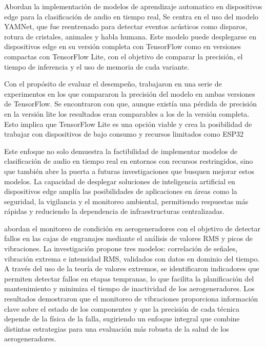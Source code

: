

\citeauthor{malmberg_real-time_2021} \citeyear{malmberg_real-time_2021} Abordan la implementación de modelos de aprendizaje automatico en dispositivos edge para la clasificación de audio en tiempo real, Se centra en el uso del modelo YAMNet, que fue reentrenado para detectar eventos acústicos como disparos, rotura de cristales, animales y habla humana. Este modelo puede desplegarse en dispositivos edge en su versión completa con TensorFlow como en versiones compactas con TensorFlow Lite, con el objetivo de comparar la precisión, el tiempo de inferencia y el uso de memoria de cada variante.

Con el propósito de evaluar el desempeño, trabajaron en una serie de experimentos en los que compararon la precisión del modelo en ambas versiones de TensorFlow. Se encontraron con que, aunque existía una pérdida de precisión en la versión lite los resultados eran comparables a los de la versión completa. Esto implica que TensorFlow Lite es una opción viable y crea la posibilidad de trabajar con dispositivos de bajo consumo y recursos limitados como ESP32

Este enfoque no solo demuestra la factibilidad de implementar modelos de clasificación de audio en tiempo real en entornos con recursos restringidos, sino que también abre la puerta a futuras investigaciones que busquen mejorar estos modelos. La capacidad de desplegar soluciones de inteligencia artificial en dispositivos edge amplía las posibilidades de aplicaciones en áreas como la seguridad, la vigilancia y el monitoreo ambiental, permitiendo respuestas más rápidas y reduciendo la dependencia de infraestructuras centralizadas.


\citeauthor{igba_analysing_2016} \citeyear{igba_analysing_2016} abordan el monitoreo de condición en aerogeneradores con el objetivo de detectar fallos en las cajas de engranajes mediante el análisis de valores RMS y picos de vibraciones. La investigación propone tres modelos: correlación de señales, vibración extrema e intensidad RMS, validados con datos en dominio del tiempo. A través del uso de la teoría de valores extremos, se identificaron indicadores que permiten detectar fallos en etapas tempranas, lo que facilita la planificación del mantenimiento y minimiza el tiempo de inactividad de los aerogeneradores. Los resultados demostraron que el monitoreo de vibraciones proporciona información clave sobre el estado de los componentes y que la precisión de cada técnica depende de la física de la falla, sugiriendo un enfoque integral que combine distintas estrategias para una evaluación más robusta de la salud de los aerogeneradores.

